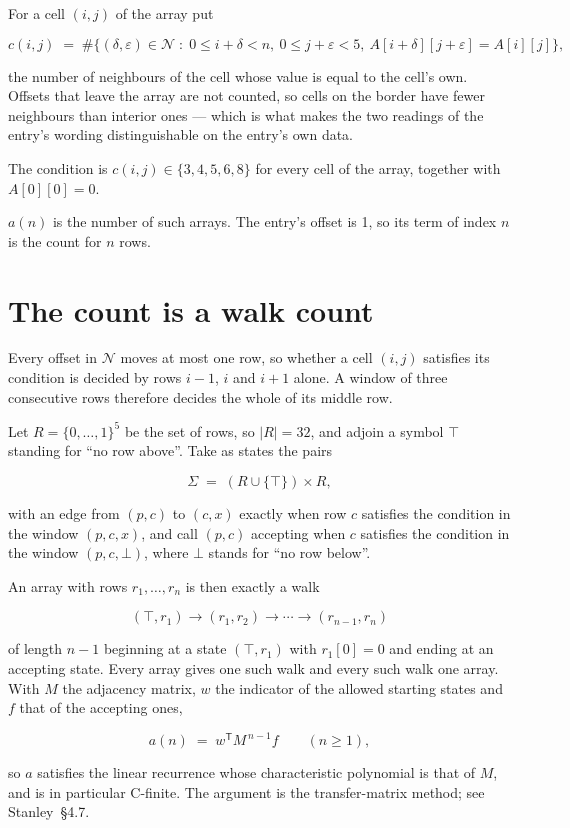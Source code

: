 \documentclass[11pt]{article}
\theoremstyle{definition}
\begin{document}
For a cell $(i,j)$ of the array put

\[c(i,j) \;=\; \#\bigl\{(\delta,\varepsilon)\in\mathcal{N} \;:\; 0\le i+\delta<n,\ 0\le j+\varepsilon<5,\ A[i+\delta][j+\varepsilon] = A[i][j]\bigr\},\]

the number of neighbours of the cell whose value is equal to the cell's own. Offsets that leave the array are not counted, so cells on the border have fewer neighbours than interior ones --- which is what makes the two readings of the entry's wording distinguishable on the entry's own data.

The condition is $c(i,j) \in \{3, 4, 5, 6, 8\}$ for every cell of the array, together with $A[0][0]=0$.

$a(n)$ is the number of such arrays. The entry's offset is 1, so its term of index $n$ is the count for $n$ rows.

\section{The count is a walk count}

Every offset in $\mathcal{N}$ moves at most one row, so whether a cell $(i,j)$ satisfies its condition is decided by rows $i-1$, $i$ and $i+1$ alone. A window of three consecutive rows therefore decides the whole of its middle row.

Let $R = \{0,\dots,1\}^{5}$ be the set of rows, so $|R| = 32$, and adjoin a symbol $\top$ standing for ``no row above''. Take as states the pairs

\[\Sigma \;=\; (R \cup \{\top\}) \times R,\]

with an edge from $(p,c)$ to $(c,x)$ exactly when row $c$ satisfies the condition in the window $(p,c,x)$, and call $(p,c)$ accepting when $c$ satisfies the condition in the window $(p,c,\bot)$, where $\bot$ stands for ``no row below''.

An array with rows $r_1,\dots,r_n$ is then exactly a walk

\[(\top,r_1) \to (r_1,r_2) \to \cdots \to (r_{n-1},r_n)\]

of length $n-1$ beginning at a state $(\top,r_1)$ with $r_1[0]=0$ and ending at an accepting state. Every array gives one such walk and every such walk one array. With $M$ the adjacency matrix, $w$ the indicator of the allowed starting states and $f$ that of the accepting ones,

\[a(n) \;=\; w^{\mathsf T} M^{\,n-1} f \qquad (n \ge 1),\]

so $a$ satisfies the linear recurrence whose characteristic polynomial is that of $M$, and is in particular C-finite. The argument is the transfer-matrix method; see Stanley~\S4.7.
\end{document}
